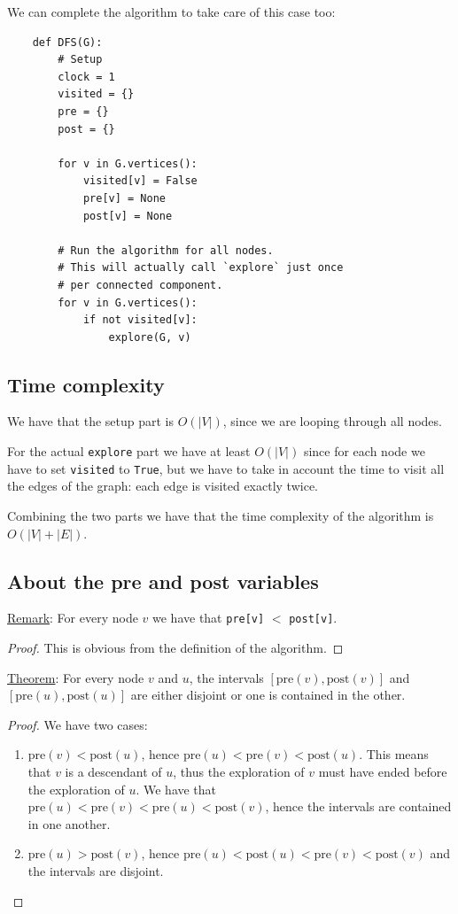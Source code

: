 \documentclass[10pt]{extarticle}
\begin{document}
We can complete the algorithm to take care of this case too:

\begin{verbatim}
    def DFS(G):
        # Setup
        clock = 1
        visited = {}
        pre = {}
        post = {}

        for v in G.vertices():
            visited[v] = False
            pre[v] = None
            post[v] = None

        # Run the algorithm for all nodes.
        # This will actually call `explore` just once
        # per connected component.
        for v in G.vertices():
            if not visited[v]:
                explore(G, v)

\end{verbatim}

\subsection{Time complexity}

We have that the setup part is $O(|V|)$, since we are looping through all nodes.

For the actual \texttt{explore} part we have at least $O(|V|)$ since for each node we have to set \texttt{visited} to \texttt{True},
but we have to take in account the time to visit all the edges of the graph:
each edge is visited exactly twice.

Combining the two parts we have that the time complexity of the algorithm is $O(|V| + |E|)$.

\subsection{About the pre and post variables}

\underline{Remark}: For every node $v$ we have that \texttt{pre[v]} $<$ \texttt{post[v]}.

\begin{proof}
    This is obvious from the definition of the algorithm.
\end{proof}

\underline{Theorem}: For every node $v$ and $u$, the intervals $[\text{pre}(v), \text{post}(v)]$ and $[\text{pre}(u), \text{post}(u)]$ are either disjoint or one is contained in the other.

\begin{proof}
    We have two cases:
    \begin{enumerate}
        \item $\text{pre}(v) < \text{post}(u)$, hence $\text{pre}(u) < \text{pre}(v) < \text{post}(u)$. This means that $v$ is a descendant of $u$, thus the exploration of $v$ must have ended before the exploration of $u$.
              We have that $\text{pre}(u) < \text{pre}(v) < \text{pre}(u) < \text{post}(v)$, hence the intervals are contained in one another.
        \item $\text{pre}(u) > \text{post}(v)$, hence $\text{pre}(u) < \text{post}(u) < \text{pre}(v) < \text{post}(v)$ and the intervals are disjoint.
    \end{enumerate}
\end{proof}
\end{document}
